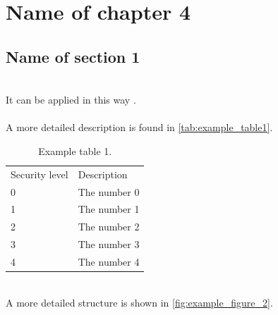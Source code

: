 \documentclass[../main.tex]{subfiles}
\begin{document}
    \chapter{Name of chapter 4}
    \lipsum[1]
    
    \section{Name of section 1}
    \lipsum[1]\\
    It can be applied in this way \citep{example_reference1}. \\ \\
    A more detailed description is found in \autoref{tab:example_table1}. 
    
    \begin{table}[H]
        \small
        \caption{Example table 1.}
        \label{tab:example_table1}
        \centering
        \renewcommand{\arraystretch}{1.5}
        \begin{tabular}{l|p{25em}}
        \cellcolor{gray!25}Security level & \cellcolor{gray!25}Description \\
        \Xhline{2\arrayrulewidth}
            0 & The number 0\\
            \hline
            1 & The number 1\\
            \hline
            2 & The number 2 \\
            \hline
            3 & The number 3 \\
            \hline
            4 & The number 4 \\
            \hline
        \end{tabular}
        \renewcommand{\arraystretch}{1}
    \end{table}
    \color{black}
    
    \lipsum[1]\\
    A more detailed structure is shown in \autoref{fig:example_figure_2}.\\ \\
    
\end{document}
